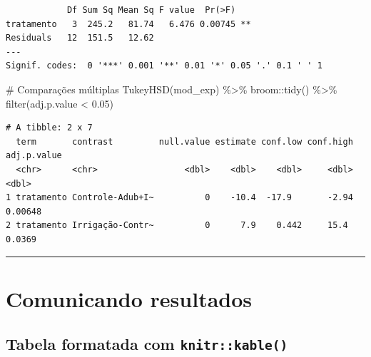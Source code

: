 \documentclass[
  letterpaper,
]{scrbook}
\newenvironment{Shaded}{\begin{snugshade}}{\end{snugshade}}
\newcommand{\CommentTok}[1]{\textcolor[rgb]{0.37,0.37,0.37}{#1}}
\newcommand{\FloatTok}[1]{\textcolor[rgb]{0.68,0.00,0.00}{#1}}
\newcommand{\FunctionTok}[1]{\textcolor[rgb]{0.28,0.35,0.67}{#1}}
\newcommand{\NormalTok}[1]{\textcolor[rgb]{0.00,0.23,0.31}{#1}}
\newcommand{\SpecialCharTok}[1]{\textcolor[rgb]{0.37,0.37,0.37}{#1}}
\begin{document}
\begin{verbatim}
            Df Sum Sq Mean Sq F value  Pr(>F)   
tratamento   3  245.2   81.74   6.476 0.00745 **
Residuals   12  151.5   12.62                   
---
Signif. codes:  0 '***' 0.001 '**' 0.01 '*' 0.05 '.' 0.1 ' ' 1
\end{verbatim}

\begin{Shaded}
\begin{Highlighting}[]
\CommentTok{\# Comparações múltiplas}
\FunctionTok{TukeyHSD}\NormalTok{(mod\_exp) }\SpecialCharTok{\%\textgreater{}\%} 
\NormalTok{  broom}\SpecialCharTok{::}\FunctionTok{tidy}\NormalTok{() }\SpecialCharTok{\%\textgreater{}\%} 
  \FunctionTok{filter}\NormalTok{(adj.p.value }\SpecialCharTok{\textless{}} \FloatTok{0.05}\NormalTok{)}
\end{Highlighting}
\end{Shaded}

\begin{verbatim}
# A tibble: 2 x 7
  term       contrast         null.value estimate conf.low conf.high adj.p.value
  <chr>      <chr>                 <dbl>    <dbl>    <dbl>     <dbl>       <dbl>
1 tratamento Controle-Adub+I~          0    -10.4  -17.9       -2.94     0.00648
2 tratamento Irrigação-Contr~          0      7.9    0.442     15.4      0.0369 
\end{verbatim}

\begin{center}\rule{0.5\linewidth}{0.5pt}\end{center}

\section{Comunicando resultados}\label{comunicando-resultados}

\subsection{\texorpdfstring{Tabela formatada com
\texttt{knitr::kable()}}{Tabela formatada com knitr::kable()}}\label{tabela-formatada-com-knitrkable}
\end{document}
